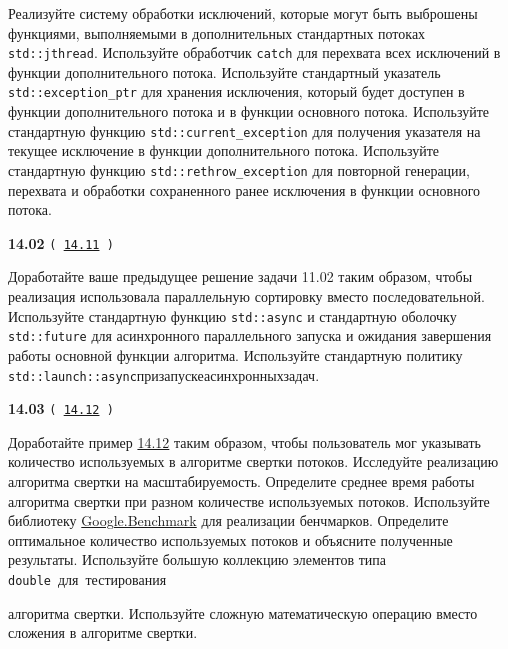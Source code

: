 \documentclass[a4paper,12pt]{article}
\begin{document}
\bigskip

Реализуйте систему обработки исключений, которые могут быть выброшены функциями, выполняемыми в дополнительных стандартных потоках \lstinline{std::jthread}. Используйте обработчик \lstinline{catch} для перехвата всех исключений в функции дополнительного потока. Используйте стандартный указатель \lstinline{std::exception_ptr} для хранения исключения, который будет доступен в функции дополнительного потока и в функции основного потока. Используйте стандартную функцию \lstinline{std::current_exception} для получения указателя на текущее исключение в функции дополнительного потока. Используйте стандартную функцию \lstinline{std::rethrow_exception} для повторной генерации, перехвата и обработки сохраненного ранее исключения в функции основного потока.

\bigskip

{\large \textbf{14.02} \texttt{(\,\href{https://github.com/i-s-m-mipt/Education/blob/master/projects/examples/source/14.11.cpp}{14.11}\,)}}

\bigskip

Доработайте ваше предыдущее решение задачи 11.02 таким образом, чтобы реализация использовала параллельную сортировку вместо последовательной. Используйте стандартную функцию \lstinline{std::async} и стандартную оболочку \lstinline{std::future} для асинхронного параллельного запуска и ожидания завершения работы основной функции алгоритма. Используйте стандартную политику \lstinline{std::launch::async}\:при\:запуске\:асинхронных\:задач.

\bigskip

{\large \textbf{14.03} \texttt{(\,\href{https://github.com/i-s-m-mipt/Education/blob/master/projects/examples/source/14.12.cpp}{14.12}\,)}}

\bigskip

Доработайте пример \href{https://github.com/i-s-m-mipt/Education/blob/master/projects/examples/source/14.12.cpp}{14.12} таким образом, чтобы пользователь мог указывать количество используемых в алгоритме свертки потоков. Исследуйте реализацию алгоритма свертки на масштабируемость. Определите среднее время работы алгоритма свертки при разном количестве используемых потоков. Используйте библиотеку \href{https://github.com/google/benchmark}{Google.Benchmark} для реализации бенчмарков. Определите оптимальное количество используемых потоков и объясните полученные результаты. Используйте большую коллекцию элементов типа \lstinline{double}~для~тестирования 

алгоритма свертки. Используйте сложную математическую операцию вместо сложения в алгоритме свертки.
\end{document}
